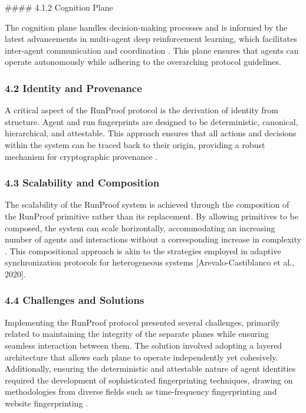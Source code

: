 \documentclass[11pt]{article}
\begin{document}
\#\#\#\# 4.1.2 Cognition Plane

The cognition plane handles decision-making processes and is informed by the latest advancements in multi-agent deep reinforcement learning, which facilitates inter-agent communication and coordination \cite{Zhu2022}. This plane ensures that agents can operate autonomously while adhering to the overarching protocol guidelines.

\subsubsection{4.2 Identity and Provenance}

A critical aspect of the RunProof protocol is the derivation of identity from structure. Agent and run fingerprints are designed to be deterministic, canonical, hierarchical, and attestable. This approach ensures that all actions and decisions within the system can be traced back to their origin, providing a robust mechanism for cryptographic provenance \cite{Shore2025}.

\subsubsection{4.3 Scalability and Composition}

The scalability of the RunProof system is achieved through the composition of the RunProof primitive rather than its replacement. By allowing primitives to be composed, the system can scale horizontally, accommodating an increasing number of agents and interactions without a corresponding increase in complexity \cite{Li2025}. This compositional approach is akin to the strategies employed in adaptive synchronization protocols for heterogeneous systems [Arevalo-Castiblanco et al., 2020].

\subsubsection{4.4 Challenges and Solutions}

Implementing the RunProof protocol presented several challenges, primarily related to maintaining the integrity of the separate planes while ensuring seamless interaction between them. The solution involved adopting a layered architecture that allows each plane to operate independently yet cohesively. Additionally, ensuring the deterministic and attestable nature of agent identities required the development of sophisticated fingerprinting techniques, drawing on methodologies from diverse fields such as time-frequency fingerprinting \cite{Shore2025} and website fingerprinting \cite{Bhat2018}.
\end{document}
